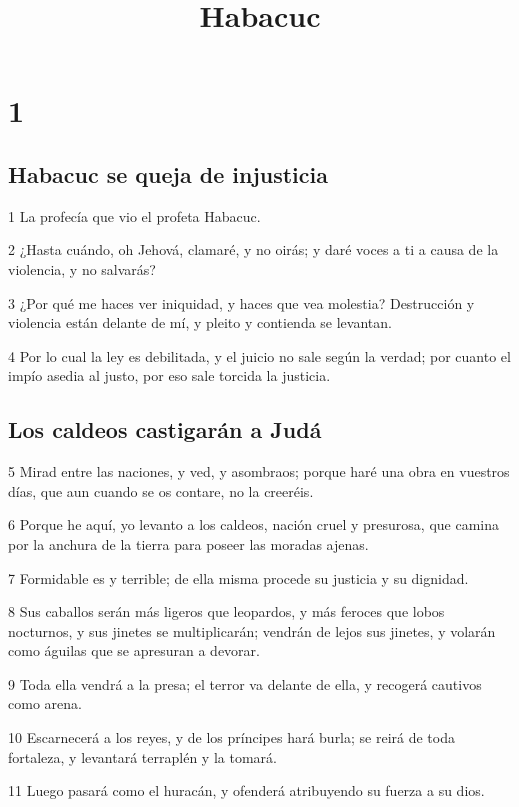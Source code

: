 

\title{Habacuc}

\chapter{1}

\section*{Habacuc se queja de injusticia}

\par 1 La profecía que vio el profeta Habacuc.
\par 2 ¿Hasta cuándo, oh Jehová, clamaré, y no oirás; y daré voces a ti a causa de la violencia, y no salvarás?
\par 3 ¿Por qué me haces ver iniquidad, y haces que vea molestia? Destrucción y violencia están delante de mí, y pleito y contienda se levantan.
\par 4 Por lo cual la ley es debilitada, y el juicio no sale según la verdad; por cuanto el impío asedia al justo, por eso sale torcida la justicia.

\section*{Los caldeos castigarán a Judá}

\par 5 Mirad entre las naciones, y ved, y asombraos; porque haré una obra en vuestros días, que aun cuando se os contare, no la creeréis. 
\par 6 Porque he aquí, yo levanto a los caldeos, nación cruel y presurosa, que camina por la anchura de la tierra para poseer las moradas ajenas.
\par 7 Formidable es y terrible; de ella misma procede su justicia y su dignidad.
\par 8 Sus caballos serán más ligeros que leopardos, y más feroces que lobos nocturnos, y sus jinetes se multiplicarán; vendrán de lejos sus jinetes, y volarán como águilas que se apresuran a devorar.
\par 9 Toda ella vendrá a la presa; el terror va delante de ella, y recogerá cautivos como arena.
\par 10 Escarnecerá a los reyes, y de los príncipes hará burla; se reirá de toda fortaleza, y levantará terraplén y la tomará.
\par 11 Luego pasará como el huracán, y ofenderá atribuyendo su fuerza a su dios.

